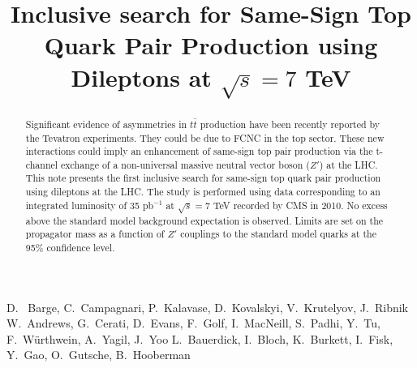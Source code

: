 \documentclass{cmspaper}
\begin{document}
%
\begin{titlepage}
\title{Inclusive search for Same-Sign Top Quark Pair Production using Dileptons at $\sqrt{s} = 7 $ TeV}

  \begin{Authlist}
    D.~ Barge, C.~Campagnari, P.~Kalavase, D.~Kovalskyi, V.~Krutelyov, J.~Ribnik
    W.~Andrews, G.~Cerati, D.~Evans, F.~Golf, I.~MacNeill, S.~Padhi, Y.~Tu, F.~W\"urthwein, A.~Yagil, J.~Yoo
    L.~Bauerdick, I.~Bloch, K.~Burkett, I.~Fisk, Y.~Gao, O.~Gutsche, B.~Hooberman
  \end{Authlist}

\begin{abstract}
Significant evidence of asymmetries in $t\bar{t}$ production have been recently 
reported by the Tevatron experiments.   They could be due to FCNC in the top
sector.  These new interactions
could imply an enhancement of  same-sign top pair production via 
the t-channel exchange of a non-universal 
massive neutral vector boson ($Z'$) at the LHC. 
This note presents the first inclusive search for same-sign top quark 
pair production using dileptons at the LHC. 
The study is performed using data corresponding to an integrated luminosity 
of 35 pb$^{-1}$ at $\sqrt{s} = 7 $ TeV recorded  by CMS in 2010. 
No excess above the standard model background expectation is observed. 
Limits are set on the propagator mass as a function of $Z'$ couplings to 
the standard model quarks at the 95\% confidence level. 
\end{abstract}
\end{titlepage}





\clearpage

\end{document}
